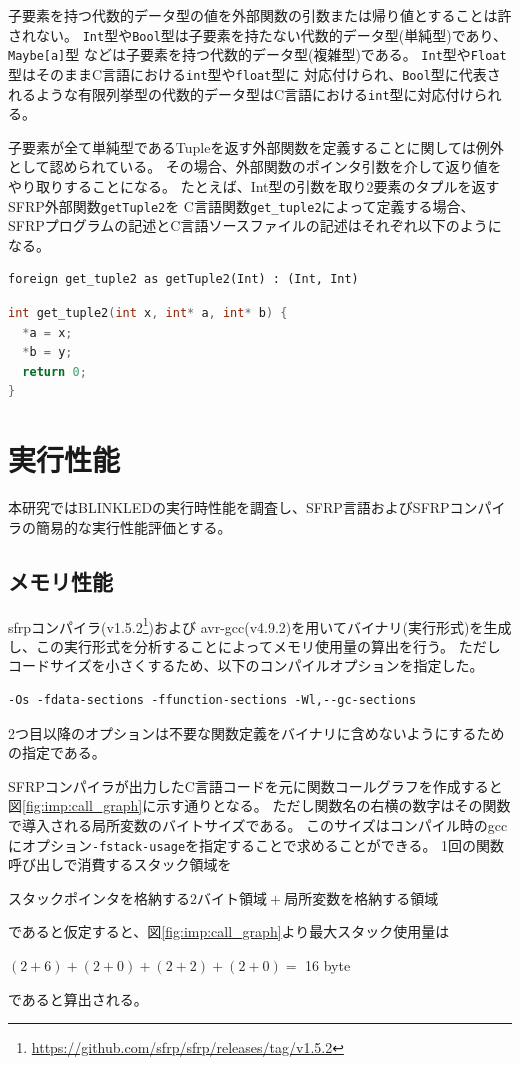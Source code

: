 子要素を持つ代数的データ型の値を外部関数の引数または帰り値とすることは許されない。
\texttt{Int}型や\texttt{Bool}型は子要素を持たない代数的データ型(単純型)であり、\texttt{Maybe[a]}型
などは子要素を持つ代数的データ型(複雑型)である。
\texttt{Int}型や\texttt{Float}型はそのままC言語における\texttt{int}型や\texttt{float}型に
対応付けられ、\texttt{Bool}型に代表されるような有限列挙型の代数的データ型はC言語における\texttt{int}型に対応付けられる。

子要素が全て単純型であるTupleを返す外部関数を定義することに関しては例外として認められている。
その場合、外部関数のポインタ引数を介して返り値をやり取りすることになる。
たとえば、Int型の引数を取り2要素のタプルを返すSFRP外部関数\texttt{getTuple2}を
C言語関数\texttt{get\_tuple2}によって定義する場合、
SFRPプログラムの記述とC言語ソースファイルの記述はそれぞれ以下のようになる。
\begin{lstlisting}[basicstyle=\ttfamily\small,language=SFRP]
foreign get_tuple2 as getTuple2(Int) : (Int, Int)
\end{lstlisting}
\begin{lstlisting}[basicstyle=\ttfamily\small,language=C]
int get_tuple2(int x, int* a, int* b) {
  *a = x;
  *b = y;
  return 0;
}
\end{lstlisting}


\section{実行性能}\label{sec:implementation:performance}
本研究ではBLINKLEDの実行時性能を調査し、SFRP言語およびSFRPコンパイラの簡易的な実行性能評価とする。

\subsection{メモリ性能}
sfrpコンパイラ(v1.5.2\footnote{\url{https://github.com/sfrp/sfrp/releases/tag/v1.5.2}})および
avr-gcc(v4.9.2)を用いてバイナリ(実行形式)を生成し、この実行形式を分析することによってメモリ使用量の算出を行う。
ただしコードサイズを小さくするため、以下のコンパイルオプションを指定した。
\begin{lstlisting}[basicstyle=\ttfamily\small,numbers=none,frame=none]
-Os -fdata-sections -ffunction-sections -Wl,--gc-sections
\end{lstlisting}
2つ目以降のオプションは不要な関数定義をバイナリに含めないようにするための指定である。

SFRPコンパイラが出力したC言語コードを元に関数コールグラフを作成すると図\ref{fig:imp:call_graph}に示す通りとなる。
ただし関数名の右横の数字はその関数で導入される局所変数のバイトサイズである。
このサイズはコンパイル時のgccにオプション\texttt{-fstack-usage}を指定することで求めることができる。
1回の関数呼び出しで消費するスタック領域を
\begin{center}
$スタックポインタを格納する2バイト領域 + 局所変数を格納する領域$
\end{center}
であると仮定すると、図\ref{fig:imp:call_graph}より最大スタック使用量は
\begin{center}
$(2 + 6) + (2 + 0) + (2 + 2) + (2 + 0) =$ 16 byte\\
\end{center}
であると算出される。

